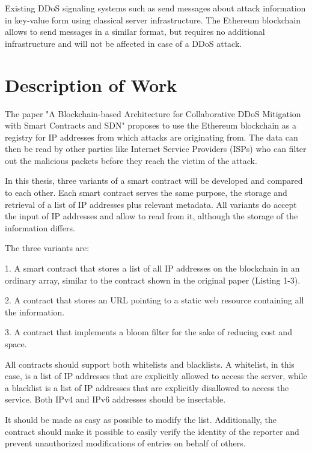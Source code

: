 Existing DDoS signaling systems such as \cite{IETFDraft} send messages about attack information in key-value form using classical server infrastructure. The Ethereum blockchain allows to send messages in a similar format, but requires no additional infrastructure and will not be affected in case of a DDoS attack.

\section{Description of Work}

The paper {"}A Blockchain-based Architecture for Collaborative DDoS Mitigation with Smart Contracts and SDN{"} \cite{OriginalPaper} proposes to use the Ethereum blockchain as a registry for IP addresses from which attacks are originating from. The data can then be read by other parties like Internet Service Providers (ISPs) who can filter out the malicious packets before they reach the victim of the attack.

In this thesis, three variants of a smart contract will be developed and compared to each other. Each smart contract serves the same purpose, the storage and retrieval of a list of IP addresses plus relevant metadata. All variants do accept the input of IP addresses and allow to read from it, although the storage of the information differs.

The three variants are:

1. A smart contract that stores a list of all IP addresses on the blockchain in an ordinary array, similar to the contract shown in the original paper \cite{OriginalPaper} (Listing 1-3).

2. A contract that stores an URL pointing to a static web resource containing all the information.

3. A contract that implements a bloom filter for the sake of reducing cost and space.

All contracts should support both whitelists and blacklists.
A whitelist, in this case, is a list of IP addresses that are explicitly allowed to access the server, while a blacklist is a list of IP addresses that are explicitly disallowed to access the service.
Both IPv4 and IPv6 addresses should be insertable.

It should be made as easy as possible to modify the list. Additionally, the contract should make it possible to easily verify the identity of the reporter and prevent unauthorized modifications of entries on behalf of others.

